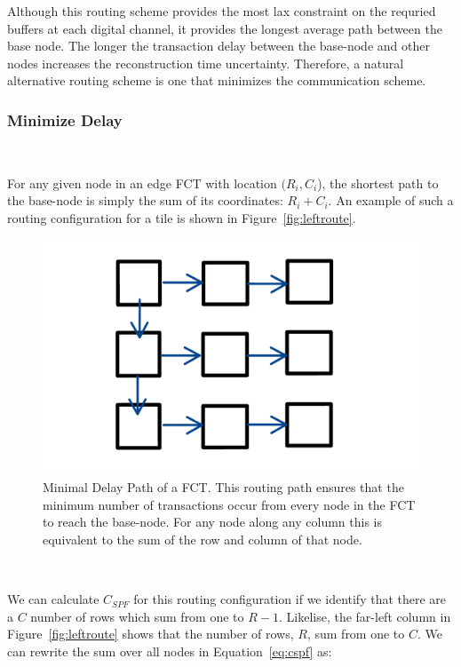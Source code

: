 Although this routing scheme provides the most lax constraint on the requried buffers at each digital channel, it provides the longest average path between the base node.
The longer the transaction delay between the base-node and other nodes increases the reconstruction time uncertainty.
Therefore, a natural alternative routing scheme is one that minimizes the communication scheme.

\subsubsection{Minimize Delay}~\label{sec:min_comm}

For any given node in an edge FCT with location $(R_{i},C_{i}$), the shortest path to the base-node is simply the sum of its coordinates: $R_{i}+C_{i}$.
An example of such a routing configuration for a tile is shown in Figure~\ref{fig:leftroute}.

\begin{figure}[]
\centering
\includegraphics[width=\textwidth]{images/leftroute.pdf}
\caption{Minimal Delay Path of a FCT. This routing path ensures that the minimum number of transactions occur from every node in the FCT to reach the base-node. For any node along any column this is equivalent to the sum of the row and column of that node.}
\end{figure}~\label{fig:leftroute}

We can calculate $C_{SPF}$ for this routing configuration if we identify that there are a $C$ number of rows which sum from one to $R-1$.
Likelise, the far-left column in Figure~\ref{fig:leftroute} shows that the number of rows, $R$, sum from one to $C$.
We can rewrite the sum over all nodes in Equation~\ref{eq:cspf} as:

